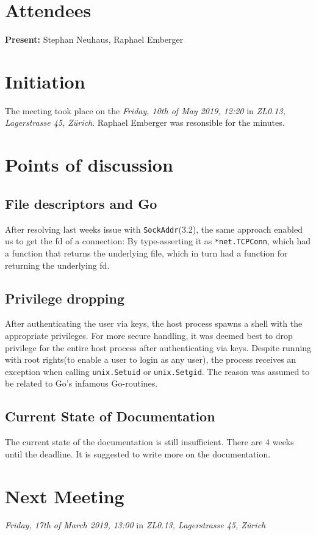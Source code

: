\documentclass[10pt,a4paper,twoside,english,minutes]{zhawreprt}
\begin{document}
\maketitle

\section{Attendees}\label{sec:Attandees}
\textbf{Present:} Stephan Neuhaus, Raphael Emberger

\section{Initiation}\label{sec:Initiation}
The meeting took place on the \textit{Friday, 10th of May 2019, 12:20} in \textit{ZL0.13, Lagerstrasse 45, Zürich}. Raphael Emberger was resonsible for the minutes.

\section{Points of discussion}
\subsection{File descriptors and Go}
After resolving last weeks issue with \texttt{SockAddr}(3.2), the same approach enabled us to get the fd of a connection: By type-asserting it as \texttt{*net.TCPConn}, which had a function that returns the underlying file, which in turn had a function for returning the underlying fd.

\subsection{Privilege dropping}
After authenticating the user via keys, the host process spawns a shell with the appropriate privileges. For more secure handling, it was deemed best to drop privilege for the entire host process after authenticating via keys. Despite running with root rights(to enable a user to login as any user), the process receives an exception when calling \texttt{unix.Setuid} or \texttt{unix.Setgid}. The reason was assumed to be related to Go's infamous Go-routines.

\subsection{Current State of Documentation}
The current state of the documentation is still insufficient. There are 4 weeks until the deadline. It is suggested to write more on the documentation.

\section*{Next Meeting}
\textit{Friday, 17th of March 2019, 13:00} in \textit{ZL0.13, Lagerstrasse 45, Zürich}
\end{document}
